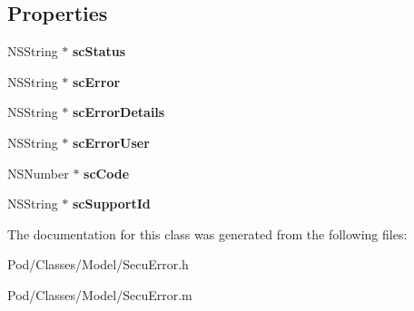 \subsection*{Properties}
\begin{DoxyCompactItemize}
\item 
N\+S\+String $\ast$ {\bfseries sc\+Status}\hypertarget{interface_secu_error_a6dbd470f8c099bf819a33c770932ea95}{}\label{interface_secu_error_a6dbd470f8c099bf819a33c770932ea95}

\item 
N\+S\+String $\ast$ {\bfseries sc\+Error}\hypertarget{interface_secu_error_a6116c9464c92ac183ba8af9d6a7a90f5}{}\label{interface_secu_error_a6116c9464c92ac183ba8af9d6a7a90f5}

\item 
N\+S\+String $\ast$ {\bfseries sc\+Error\+Details}\hypertarget{interface_secu_error_a3bceb064fc00af371d7862e6dcf9fba6}{}\label{interface_secu_error_a3bceb064fc00af371d7862e6dcf9fba6}

\item 
N\+S\+String $\ast$ {\bfseries sc\+Error\+User}\hypertarget{interface_secu_error_a5664df44b05d4e738bbed3d290783350}{}\label{interface_secu_error_a5664df44b05d4e738bbed3d290783350}

\item 
N\+S\+Number $\ast$ {\bfseries sc\+Code}\hypertarget{interface_secu_error_a408c083f706c421fad31053b5514f505}{}\label{interface_secu_error_a408c083f706c421fad31053b5514f505}

\item 
N\+S\+String $\ast$ {\bfseries sc\+Support\+Id}\hypertarget{interface_secu_error_aa3e0fc1b942cd239255605df1fe5c2ff}{}\label{interface_secu_error_aa3e0fc1b942cd239255605df1fe5c2ff}

\end{DoxyCompactItemize}


The documentation for this class was generated from the following files\+:\begin{DoxyCompactItemize}
\item 
Pod/\+Classes/\+Model/Secu\+Error.\+h\item 
Pod/\+Classes/\+Model/Secu\+Error.\+m\end{DoxyCompactItemize}

